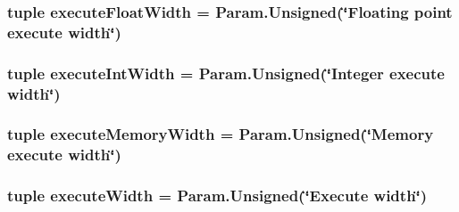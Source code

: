 \label{classOzoneCPU_1_1DerivOzoneCPU_a85784e938a57b92cd9d1eeaaca8500b1}
\hypertarget{classOzoneCPU_1_1DerivOzoneCPU_a29617aaf82ccd8820fe66dd71d954fee}{
\subsubsection[{executeFloatWidth}]{\setlength{\rightskip}{0pt plus 5cm}tuple {\bf executeFloatWidth} = Param.Unsigned(\char`\"{}Floating point execute {\bf width}\char`\"{})}}
\label{classOzoneCPU_1_1DerivOzoneCPU_a29617aaf82ccd8820fe66dd71d954fee}
\hypertarget{classOzoneCPU_1_1DerivOzoneCPU_a0231660f86020f1dddc6d827aed5a711}{
\subsubsection[{executeIntWidth}]{\setlength{\rightskip}{0pt plus 5cm}tuple {\bf executeIntWidth} = Param.Unsigned(\char`\"{}Integer execute {\bf width}\char`\"{})}}
\label{classOzoneCPU_1_1DerivOzoneCPU_a0231660f86020f1dddc6d827aed5a711}
\hypertarget{classOzoneCPU_1_1DerivOzoneCPU_a4251b67a387181c64371cc3f1bed89e7}{
\subsubsection[{executeMemoryWidth}]{\setlength{\rightskip}{0pt plus 5cm}tuple {\bf executeMemoryWidth} = Param.Unsigned(\char`\"{}Memory execute {\bf width}\char`\"{})}}
\label{classOzoneCPU_1_1DerivOzoneCPU_a4251b67a387181c64371cc3f1bed89e7}
\hypertarget{classOzoneCPU_1_1DerivOzoneCPU_a5257b644f11c5f2c70417ef15932fb77}{
\subsubsection[{executeWidth}]{\setlength{\rightskip}{0pt plus 5cm}tuple {\bf executeWidth} = Param.Unsigned(\char`\"{}Execute {\bf width}\char`\"{})}}
